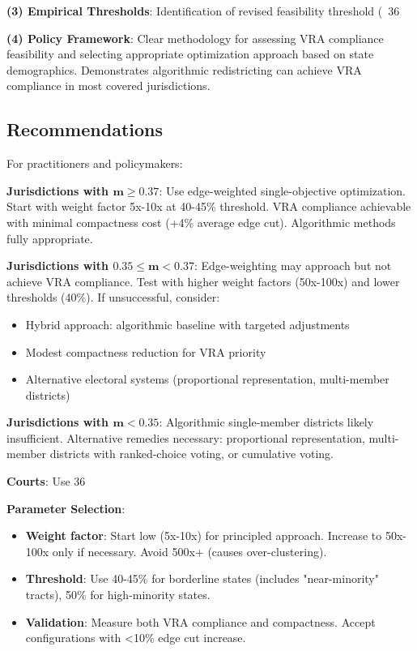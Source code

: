 \textbf{(3) Empirical Thresholds}: Identification of revised feasibility threshold (~36%

\textbf{(4) Policy Framework}: Clear methodology for assessing VRA compliance feasibility and selecting appropriate optimization approach based on state demographics. Demonstrates algorithmic redistricting can achieve VRA compliance in most covered jurisdictions.

\subsection{Recommendations}

For practitioners and policymakers:

\textbf{Jurisdictions with $\boldsymbol{m \geq 0.37}$}: Use edge-weighted single-objective optimization. Start with weight factor 5x-10x at 40-45\% threshold. VRA compliance achievable with minimal compactness cost (+4\% average edge cut). Algorithmic methods fully appropriate.

\textbf{Jurisdictions with $\boldsymbol{0.35 \leq m < 0.37}$}: Edge-weighting may approach but not achieve VRA compliance. Test with higher weight factors (50x-100x) and lower thresholds (40\%). If unsuccessful, consider:
\begin{itemize}
\item Hybrid approach: algorithmic baseline with targeted adjustments
\item Modest compactness reduction for VRA priority
\item Alternative electoral systems (proportional representation, multi-member districts)
\end{itemize}

\textbf{Jurisdictions with $\boldsymbol{m < 0.35}$}: Algorithmic single-member districts likely insufficient. Alternative remedies necessary: proportional representation, multi-member districts with ranked-choice voting, or cumulative voting.

\textbf{Courts}: Use 36%

\textbf{Parameter Selection}:
\begin{itemize}
\item \textbf{Weight factor}: Start low (5x-10x) for principled approach. Increase to 50x-100x only if necessary. Avoid 500x+ (causes over-clustering).
\item \textbf{Threshold}: Use 40-45\% for borderline states (includes "near-minority" tracts), 50\% for high-minority states.
\item \textbf{Validation}: Measure both VRA compliance and compactness. Accept configurations with <10\% edge cut increase.
\end{itemize}

